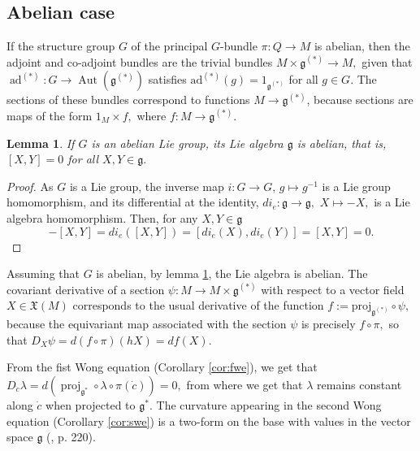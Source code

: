 \documentclass[12pt, letterpaper, reqno]{amsart}
\theoremstyle{definition}
\theoremstyle{plain}
\newtheorem{lm}{Lemma}
\theoremstyle{remark}
\begin{document}
\subsection{Abelian case}%
\label{sub:abelian_case}

If the structure group $ G $ of the principal $ G $-bundle $ \pi: Q \rightarrow M $ is abelian, then the adjoint and co-adjoint bundles are the trivial bundles $ M\times \mathfrak{g}^{(*)} \rightarrow M, $ given that $ \operatorname{ad}^{(*)} : G \rightarrow \operatorname{Aut} ( \mathfrak{g}^{(*)}) $ satisfies $ \operatorname{ad^{(*)}} (g)= 1_{ \mathfrak{g}^{(*)}} $ for all $ g\in G. $ The sections of these bundles correspond to functions $ M \rightarrow \mathfrak{g}^{(*)} $, because sections are maps of the form $ 1_M\times f, $ where $ f: M \rightarrow \mathfrak{g}^{(*)}.$ 

\begin{lm}\label{lm:minus_inverse}
	If $ G $ is an abelian Lie group, its Lie algebra $ \mathfrak{g} $ is abelian, that is, $ [X,Y]=0 $ for all $ X,Y\in \mathfrak{g}. $ 
\end{lm}
\begin{proof}
	As $ G $ is a Lie group, the inverse map $ i : G \rightarrow G $, $ g \mapsto g^{-1} $ is a Lie group homomorphism, and its differential at the identity, $di_e: \mathfrak{g} \rightarrow \mathfrak{g},  $ $ X \mapsto -X, $ is a Lie algebra homomorphism. Then, for any $ X,Y\in \mathfrak{g} $ 
	$$ -[X,Y] = di_e([X,Y]) = [di_e(X), di_e(Y)] = [X,Y]=0. $$ 
\end{proof}

Assuming that $ G$ is abelian, by lemma \ref{lm:minus_inverse}, the Lie algebra is abelian. The covariant derivative  of a section $ \psi: M \rightarrow M\times \mathfrak{g}^{(*)} $ with respect to a vector field $ X\in \mathfrak{X}(M) $ corresponds to the usual derivative of the function $f:= \operatorname{proj_{ \mathfrak{g}^{(*)}}}\circ \psi,$ because the equivariant map associated with the section $ \psi $ is precisely $ f\circ\pi, $ so that $ D_X\psi=d(f\circ\pi)(hX) = df(X). $ 

From the fist Wong equation (Corollary \ref{cor:fwe}), we get that $ D_{\dot{c}}\lambda = d( \operatorname{proj}_{ \mathfrak{g}^*}\circ \lambda\circ\pi(\dot{c}))=0, $ from where we get that $ \lambda $ remains constant along $ \dot{c} $ when projected to $ \mathfrak{g}^{*}. $ The curvature appearing in the second Wong equation (Corollary \ref{cor:swe}) is a two-form on the base with values in the vector space $ \mathfrak{g} $ (\cite{montgomery2002tour}, p. 220).
\end{document}
